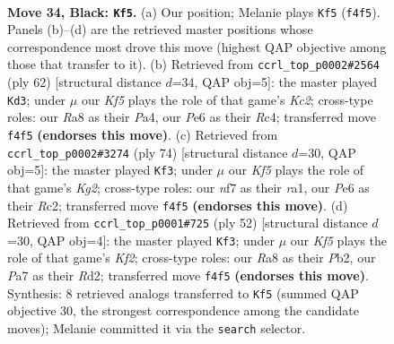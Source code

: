 \documentclass[11pt]{article}
\begin{document}
\clearpage

\begin{figure}[p]\centering
\begin{subfigure}{0.46\textwidth}\centering
\resizebox{\linewidth}{!}{%
\newchessgame
\chessboard[
  setfen={rnb5/p4NP1/2p1p3/P1Pp4/1P3k2/2P5/5K2/R7 b - - 1 34},
  showmover=false,
  pgfstyle=straightmove, color=movearrow, markmove={f4-f5}
]}
\caption{}
\end{subfigure}\hfill
\begin{subfigure}{0.46\textwidth}\centering
\resizebox{\linewidth}{!}{%
\newchessgame
\chessboard[
  setfen={8/3k4/r3p1p1/b4p1p/P1RP1B1P/6P1/2K5/8 w - - 7 32},
  showmover=false,
  pgfstyle=straightmove, color=movearrow, markmove={c2-d3}
]}
\caption{}
\end{subfigure}
\\[4pt]
\begin{subfigure}{0.46\textwidth}\centering
\resizebox{\linewidth}{!}{%
\newchessgame
\chessboard[
  setfen={6k1/p5p1/1p2p2p/5p1P/5P2/1P1P4/P1R2PK1/r7 w - - 5 38},
  showmover=false,
  pgfstyle=straightmove, color=movearrow, markmove={g2-f3}
]}
\caption{}
\end{subfigure}\hfill
\begin{subfigure}{0.46\textwidth}\centering
\resizebox{\linewidth}{!}{%
\newchessgame
\chessboard[
  setfen={2r2k2/1p3p2/p5p1/7p/1P5P/P5P1/1P1R1K2/8 w - - 1 27},
  showmover=false,
  pgfstyle=straightmove, color=movearrow, markmove={f2-f3}
]}
\caption{}
\end{subfigure}
\caption{\textbf{Move 34, Black: \texttt{Kf5}.} (a) Our position; Melanie plays \texttt{Kf5} (\texttt{f4f5}). Panels (b)--(d) are the retrieved master positions whose correspondence most drove this move (highest QAP objective among those that transfer to it). (b) Retrieved from \texttt{ccrl\_top\_p0002\#2564} (ply 62) [structural distance $d$=34, QAP obj=5]: the master played \texttt{Kd3}; under $\mu$ our \emph{Kf5} plays the role of that game's \emph{Kc2}; cross-type roles: our \emph{R}a8 as their \emph{P}a4, our \emph{P}e6 as their \emph{R}c4; transferred move \texttt{f4f5} \textbf{(endorses this move)}. (c) Retrieved from \texttt{ccrl\_top\_p0002\#3274} (ply 74) [structural distance $d$=30, QAP obj=5]: the master played \texttt{Kf3}; under $\mu$ our \emph{Kf5} plays the role of that game's \emph{Kg2}; cross-type roles: our \emph{n}f7 as their \emph{r}a1, our \emph{P}e6 as their \emph{R}c2; transferred move \texttt{f4f5} \textbf{(endorses this move)}. (d) Retrieved from \texttt{ccrl\_top\_p0001\#725} (ply 52) [structural distance $d$=30, QAP obj=4]: the master played \texttt{Kf3}; under $\mu$ our \emph{Kf5} plays the role of that game's \emph{Kf2}; cross-type roles: our \emph{R}a8 as their \emph{P}b2, our \emph{P}a7 as their \emph{R}d2; transferred move \texttt{f4f5} \textbf{(endorses this move)}. Synthesis: 8 retrieved analogs transferred to \texttt{Kf5} (summed QAP objective 30, the strongest correspondence among the candidate moves); Melanie committed it via the \texttt{search} selector.}
\label{fig:thought-m67}
\end{figure}
\end{document}

